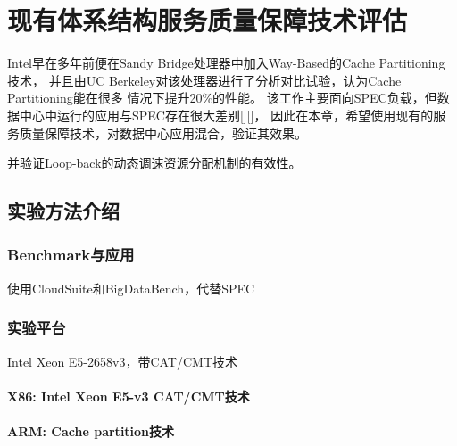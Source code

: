 

\chapter{现有体系结构服务质量保障技术评估}
\label{chap:curarch}

Intel早在多年前便在Sandy Bridge处理器中加入Way-Based的Cache Partitioning技术，
并且由UC Berkeley对该处理器进行了分析对比试验，认为Cache Partitioning能在很多
情况下提升20\%的性能。
该工作主要面向SPEC负载，但数据中心中运行的应用与SPEC存在很大差别[][]，
因此在本章，希望使用现有的服务质量保障技术，对数据中心应用混合，验证其效果。

并验证Loop-back的动态调速资源分配机制的有效性。

%

\section{实验方法介绍}

\subsection{Benchmark与应用}

使用CloudSuite和BigDataBench，代替SPEC

\subsection{实验平台}

Intel Xeon E5-2658v3，带CAT/CMT技术

\subsubsection*{X86: Intel Xeon E5-v3 CAT/CMT技术}
\subsubsection*{ARM: Cache partition技术}

